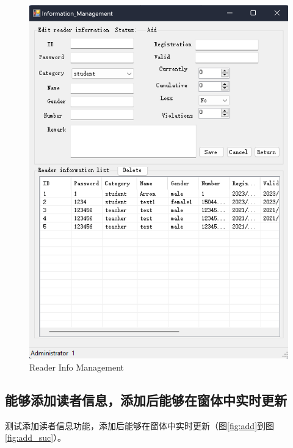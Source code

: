 \documentclass{article}
\begin{document}
\begin{figure}[H]
    \centering
    \includegraphics[width=1\textwidth]{../pic/reader_info_mag.png}
    \caption{Reader Info Management}
    \label{fig:reader_info_mag}
\end{figure}

\subsection{能够添加读者信息，添加后能够在窗体中实时更新}
测试添加读者信息功能，添加后能够在窗体中实时更新（图\ref{fig:add}到图\ref{fig:add_suc}）。
\end{document}
